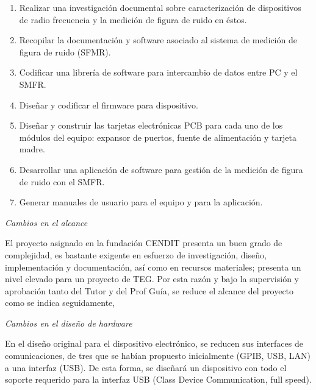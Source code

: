 \documentclass[paper=letter,oneside,fontsize=12pt, parskip=full]{article}
\begin{document}
	\begin{enumerate}
		\item Realizar una investigación documental sobre caracterización de dispositivos de radio frecuencia y la medición de figura de ruido en éstos.
		
		\item Recopilar la documentación y software asociado al sistema de medición de figura de ruido (SFMR).
	
		\item Codificar una librería de software para intercambio de datos entre PC y el SMFR.
		
		\item Diseñar y codificar el firmware para dispositivo.
		
		\item Diseñar y construir las tarjetas electrónicas PCB para cada uno de los módulos del equipo: expansor de puertos, fuente de alimentación y tarjeta madre.
		
		\item Desarrollar una aplicación de software para gestión de la medición de figura de ruido con el SMFR.
		
		\item Generar manuales de usuario para el equipo y para la aplicación.
	\end{enumerate}		

	\newpage
	
	\emph{Cambios en el alcance}
	
	El proyecto asignado en la fundación CENDIT presenta un buen grado de complejidad, es bastante exigente en esfuerzo de investigación, diseño, implementación y documentación, así como en recursos materiales; presenta un nivel elevado para un proyecto de TEG. Por esta razón y bajo la supervisión y aprobación tanto del Tutor y del Prof Guía, se reduce el alcance del proyecto como se indica seguidamente,
	
	\emph{Cambios en el diseño de hardware}

	En el diseño original para el dispositivo electrónico, se reducen sus  interfaces de comunicaciones, de tres que se habían propuesto inicialmente (GPIB, USB, LAN) a una interfaz (USB). De esta forma, se diseñará un dispositivo con todo el soporte requerido para la interfaz USB (Class Device Communication, full speed).			
\end{document}
